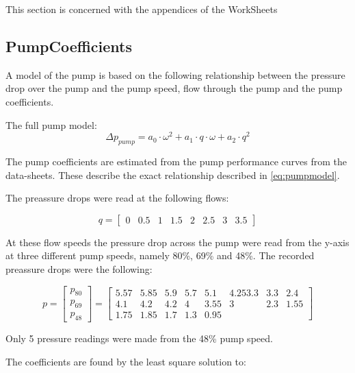 This section is concerned with the appendices of the WorkSheets

\subsection{PumpCoefficients}

A model of the pump is based on the following relationship between the pressure drop over the pump and the pump speed, flow through the pump and the pump coefficients.

The full pump model:
\begin{equation} \label{eq:pumpmodel}
		\Delta p_{pump}  = a_0  \cdot \omega^2 + a_1 \cdot q \cdot \omega + a_2 \cdot q^2
\end{equation}

The pump coefficients are estimated from the pump performance curves from the data-sheets. These describe the exact relationship described in \cref{eq:pumpmodel}.

The preassure drops were read at the following flows:

\begin{equation}
	q = \begin{bmatrix}
		0 & 0.5 & 1 & 1.5 & 2 & 2.5 & 3 & 3.5 
	\end{bmatrix} 
\label{eq:pump_q}
\end{equation}

At these flow speeds the pressure drop across the pump were read from the y-axis at three different pump speeds, namely 80\%, 69\% and 48\%. The recorded preassure drops were the following:

\begin{equation}
	p =  \begin{bmatrix}
		p_{80}\\
		p_{69} \\
		p_{48}
	\end{bmatrix}  = 
	\begin{bmatrix}
		5.57 & 5.85 & 5.9 & 5.7 & 5.1 & 4.253.3 & 3.3 & 2.4 \\
		4.1 & 4.2 & 4.2 & 4 & 3.55 & 3 & 2.3 & 1.55 \\
		1.75 & 1.85 & 1.7 & 1.3 & 0.95 &  &  &  
	\end{bmatrix} 
\label{eq:pump_p}
\end{equation}

Only 5 pressure readings were made from the 48\% pump speed.

The coefficients are found by the least square solution to:


